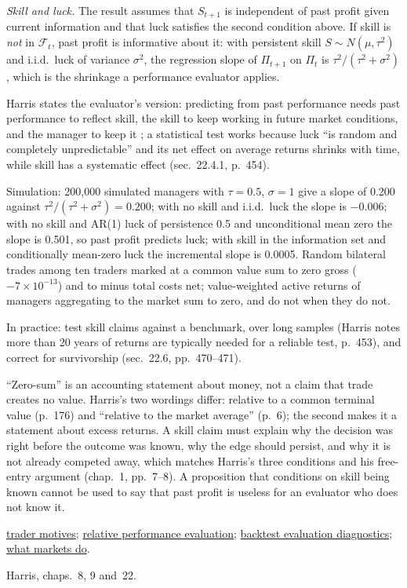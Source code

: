 \begin{qfresult}
\emph{Skill and luck.} The result assumes that $S_{t+1}$ is independent of past profit given current information and that luck satisfies the second condition above. If skill is \emph{not} in $\mathcal F_t$, past profit is informative about it: with persistent skill $S\sim N(\mu,\tau^2)$ and i.i.d.\ luck of variance $\sigma^2$, the regression slope of $\Pi_{t+1}$ on $\Pi_t$ is $\tau^2/(\tau^2+\sigma^2)$, which is the shrinkage a performance evaluator applies.

Harris states the evaluator's version: predicting from past performance needs past performance to reflect skill, the skill to keep working in future market conditions, and the manager to keep it \citep[chap.~22, sec.~22.3, p.~451]{alpha-harris}; a statistical test works because luck ``is random and completely unpredictable'' and its net effect on average returns shrinks with time, while skill has a systematic effect (sec.~22.4.1, p.~454).

 Simulation: 200{,}000 simulated managers with $\tau=0.5$, $\sigma=1$ give a slope of 0.200 against $\tau^2/(\tau^2+\sigma^2)=0.200$; with no skill and i.i.d.\ luck the slope is $-0.006$; with no skill and AR(1) luck of persistence 0.5 and unconditional mean zero the slope is 0.501, so past profit predicts luck; with skill in the information set and conditionally mean-zero luck the incremental slope is 0.0005. Random bilateral trades among ten traders marked at a common value sum to zero gross ($-7\times10^{-13}$) and to minus total costs net; value-weighted active returns of managers aggregating to the market sum to zero, and do not when they do not.

In practice: test skill claims against a benchmark, over long samples (Harris notes more than 20 years of returns are typically needed for a reliable test, p.~453), and correct for survivorship (sec.~22.6, pp.~470--471).

 ``Zero-sum'' is an accounting statement about money, not a claim that trade creates no value. Harris's two wordings differ: relative to a common terminal value (p.~176) and ``relative to the market average'' (p.~6); the second makes it a statement about excess returns. A skill claim must explain why the decision was right before the outcome was known, why the edge should persist, and why it is not already competed away, which matches Harris's three conditions and his free-entry argument (chap.~1, pp.~7--8). A proposition that conditions on skill being known cannot be used to say that past profit is useless for an evaluator who does not know it.

 \hyperref[def:trader-motives]{trader motives}; \hyperref[meth:relative-performance-evaluation]{relative performance evaluation}; \hyperref[meth:backtest-evaluation-diagnostics]{backtest evaluation diagnostics}; \hyperref[def:market-functions]{what markets do}.

 Harris, chaps.~8, 9 and~22.

\end{qfresult}

